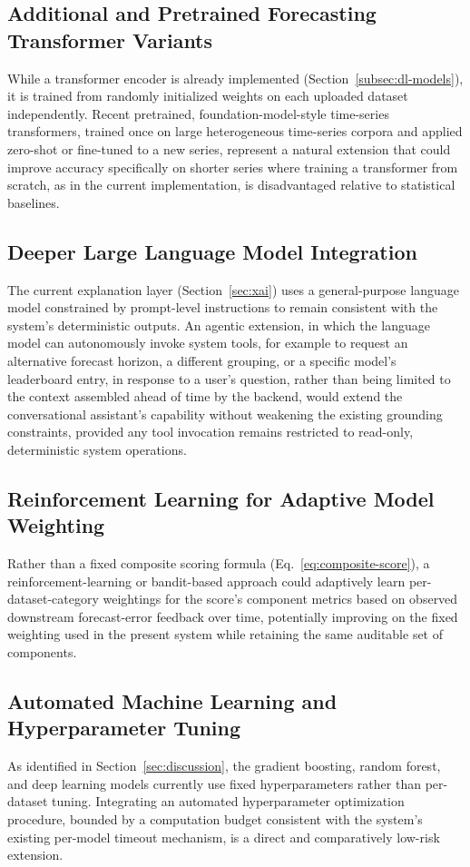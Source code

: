 \subsection{Additional and Pretrained Forecasting Transformer Variants}
While a transformer encoder is already implemented (Section~\ref{subsec:dl-models}), it is trained from randomly initialized weights on each uploaded dataset independently. Recent pretrained, foundation-model-style time-series transformers, trained once on large heterogeneous time-series corpora and applied zero-shot or fine-tuned to a new series, represent a natural extension that could improve accuracy specifically on shorter series where training a transformer from scratch, as in the current implementation, is disadvantaged relative to statistical baselines.

\subsection{Deeper Large Language Model Integration}
The current explanation layer (Section~\ref{sec:xai}) uses a general-purpose language model constrained by prompt-level instructions to remain consistent with the system's deterministic outputs. An agentic extension, in which the language model can autonomously invoke system tools, for example to request an alternative forecast horizon, a different grouping, or a specific model's leaderboard entry, in response to a user's question, rather than being limited to the context assembled ahead of time by the backend, would extend the conversational assistant's capability without weakening the existing grounding constraints, provided any tool invocation remains restricted to read-only, deterministic system operations.

\subsection{Reinforcement Learning for Adaptive Model Weighting}
Rather than a fixed composite scoring formula (Eq.~\eqref{eq:composite-score}), a reinforcement-learning or bandit-based approach could adaptively learn per-dataset-category weightings for the score's component metrics based on observed downstream forecast-error feedback over time, potentially improving on the fixed weighting used in the present system while retaining the same auditable set of components.

\subsection{Automated Machine Learning and Hyperparameter Tuning}
As identified in Section~\ref{sec:discussion}, the gradient boosting, random forest, and deep learning models currently use fixed hyperparameters rather than per-dataset tuning. Integrating an automated hyperparameter optimization procedure, bounded by a computation budget consistent with the system's existing per-model timeout mechanism, is a direct and comparatively low-risk extension.

